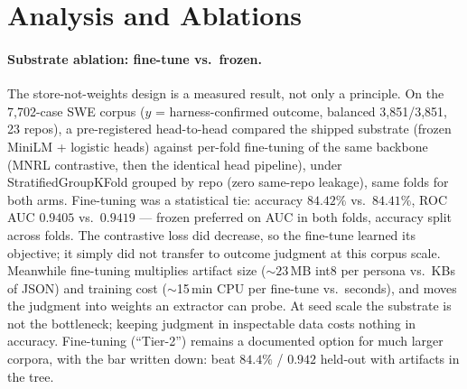 \documentclass[11pt]{article}
\begin{document}
\section{Analysis and Ablations}
\label{sec:ablations}


\paragraph{Substrate ablation: fine-tune vs.\ frozen.} The store-not-weights design is a measured result, not only a principle. On the 7,702-case SWE corpus ($y$ = harness-confirmed outcome, balanced 3,851/3,851, 23 repos), a pre-registered head-to-head compared the shipped substrate (frozen MiniLM + logistic heads) against per-fold fine-tuning of the same backbone (MNRL contrastive, then the identical head pipeline), under StratifiedGroupKFold grouped by repo (zero same-repo leakage), same folds for both arms. Fine-tuning was a statistical tie: accuracy $84.42\%$ vs.\ $84.41\%$, ROC AUC $0.9405$ vs.\ $0.9419$ --- frozen preferred on AUC in both folds, accuracy split across folds. The contrastive loss did decrease, so the fine-tune learned its objective; it simply did not transfer to outcome judgment at this corpus scale. Meanwhile fine-tuning multiplies artifact size (${\sim}23$\,MB int8 per persona vs.\ KBs of JSON) and training cost (${\sim}$15\,min CPU per fine-tune vs.\ seconds), and moves the judgment into weights an extractor can probe. At seed scale the substrate is not the bottleneck; keeping judgment in inspectable data costs nothing in accuracy. Fine-tuning (``Tier-2'') remains a documented option for much larger corpora, with the bar written down: beat $84.4\%$ / $0.942$ held-out with artifacts in the tree.
\end{document}
